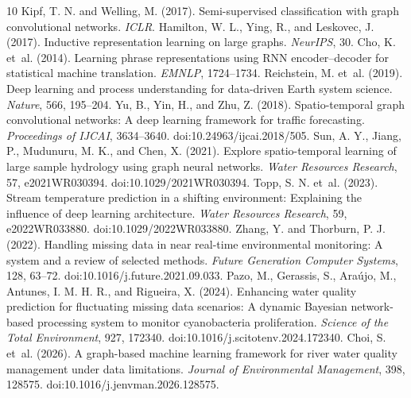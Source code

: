 \documentclass[11pt]{article}
\begin{document}

\begin{thebibliography}{10}\small
{} Kipf, T. N. and Welling, M. (2017). Semi-supervised classification with graph convolutional networks. \emph{ICLR}.
 Hamilton, W. L., Ying, R., and Leskovec, J. (2017). Inductive representation learning on large graphs. \emph{NeurIPS}, 30.
 Cho, K. et~al. (2014). Learning phrase representations using RNN encoder--decoder for statistical machine translation. \emph{EMNLP}, 1724--1734.
 Reichstein, M. et~al. (2019). Deep learning and process understanding for data-driven Earth system science. \emph{Nature}, 566, 195--204.
 Yu, B., Yin, H., and Zhu, Z. (2018). Spatio-temporal graph convolutional networks: A deep learning framework for traffic forecasting. \emph{Proceedings of IJCAI}, 3634--3640. doi:10.24963/ijcai.2018/505.
 Sun, A. Y., Jiang, P., Mudunuru, M. K., and Chen, X. (2021). Explore spatio-temporal learning of large sample hydrology using graph neural networks. \emph{Water Resources Research}, 57, e2021WR030394. doi:10.1029/2021WR030394.
 Topp, S. N. et~al. (2023). Stream temperature prediction in a shifting environment: Explaining the influence of deep learning architecture. \emph{Water Resources Research}, 59, e2022WR033880. doi:10.1029/2022WR033880.
 Zhang, Y. and Thorburn, P. J. (2022). Handling missing data in near real-time environmental monitoring: A system and a review of selected methods. \emph{Future Generation Computer Systems}, 128, 63--72. doi:10.1016/j.future.2021.09.033.
 Pazo, M., Gerassis, S., Ara{\'u}jo, M., Antunes, I. M. H. R., and Rigueira, X. (2024). Enhancing water quality prediction for fluctuating missing data scenarios: A dynamic Bayesian network-based processing system to monitor cyanobacteria proliferation. \emph{Science of the Total Environment}, 927, 172340. doi:10.1016/j.scitotenv.2024.172340.
 Choi, S. et~al. (2026). A graph-based machine learning framework for river water quality management under data limitations. \emph{Journal of Environmental Management}, 398, 128575. doi:10.1016/j.jenvman.2026.128575.
\end{thebibliography}
\end{document}
